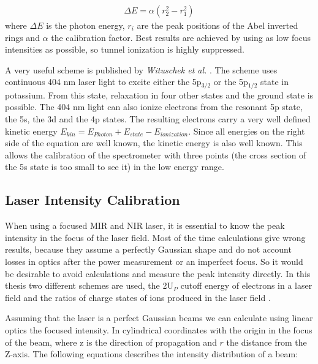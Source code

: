 \begin{align*}
\Delta E = \alpha (r_2^2-r_1^2)
\end{align*}
where $\Delta E$ is the photon energy, $r_i$ are the peak positions of the Abel inverted rings and $\alpha$ the calibration factor. Best results are achieved by using as low focus intensities as possible, so tunnel ionization is highly suppressed.

A very useful scheme is published by \textit{Wituschek et al.} \cite{wituschek_simple_2016}. The scheme uses continuous 404 nm laser light to excite either the 5p${}_{3/2}$ or the 5p${}_{1/2}$ state in potassium. From this state, relaxation in four other states and the ground state is possible. The 404 nm light can also ionize electrons from the resonant 5p state, the 5s, the 3d and the 4p states. The resulting electrons carry a very well defined kinetic energy $E_{kin}=E_{Photon}+E_{state}-E_{ionization}$. Since all energies on the right side of the equation are well known, the kinetic energy is also well known. This allows the calibration of the spectrometer with three points (the cross section of the 5s state is too small to see it) in the low energy range.
%


\subsection{Laser Intensity Calibration}
When using a focused MIR and NIR laser, it is essential to know the peak intensity in the focus of the laser field. Most of the time calculations give wrong results, because they assume a perfectly Gaussian shape and do not account losses in optics after the power measurement or an imperfect focus. So it would be desirable to avoid calculations and measure the peak intensity directly. In this thesis two different schemes are used, the 2U$_P$ cutoff energy of electrons in a laser field \cite{becker_vuv_1996} and the ratios of charge states of ions produced in the laser field \cite{augst_laser_1991}.

Assuming that the laser is a perfect Gaussian beams we can calculate using linear optics the focused intensity. In cylindrical coordinates with the origin in the focus of the beam, where z is the direction of propagation and $r$ the distance from the Z-axis. The following equations describes the intensity distribution of a beam:

